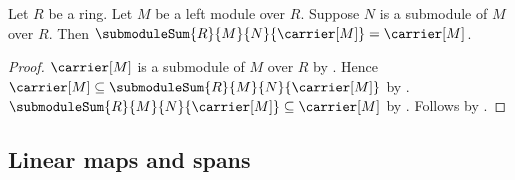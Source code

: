 \begin{theorem}\label{submodule_sum_carrier}
    Let $R$ be a ring.
    Let $M$ be a left module over $R$.
    Suppose $N$ is a submodule of $M$ over $R$.
    Then $\submoduleSum{R}{M}{N}{\carrier[M]}=\carrier[M]$.
\end{theorem}
\begin{proof}
    $\carrier[M]$ is a submodule of $M$ over $R$ by
        .
    Hence $\carrier[M]\subseteq
        \submoduleSum{R}{M}{N}{\carrier[M]}$ by
        .
    $\submoduleSum{R}{M}{N}{\carrier[M]}\subseteq\carrier[M]$ by
        .
    Follows by .
\end{proof}

\subsection{Linear maps and spans}

